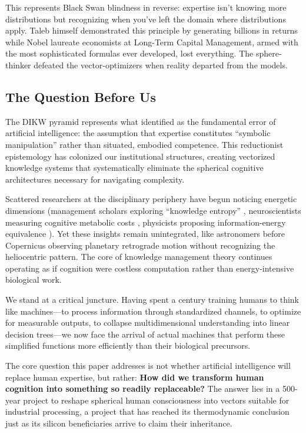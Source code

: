 This represents \citet{taleb2007} Black Swan blindness in reverse: expertise isn't knowing more distributions but recognizing when you've left the domain where distributions apply. Taleb himself demonstrated this principle by generating billions in returns while Nobel laureate economists at Long-Term Capital Management, armed with the most sophisticated formulas ever developed, lost everything. The sphere-thinker defeated the vector-optimizers when reality departed from the models.

\subsection{The Question Before Us}

The DIKW pyramid represents what \citet{dreyfus1979} identified as the fundamental error of artificial intelligence: the assumption that expertise constitutes ``symbolic manipulation'' rather than situated, embodied competence. This reductionist epistemology has colonized our institutional structures, creating vectorized knowledge systems that systematically eliminate the spherical cognitive architectures necessary for navigating complexity.

Scattered researchers at the disciplinary periphery have begun noticing energetic dimensions (management scholars exploring ``knowledge entropy'' \citep{bratianu2020}, neuroscientists measuring cognitive metabolic costs \citep{wiehler2022}, physicists proposing information-energy equivalence \citep{stonier1996}). Yet these insights remain unintegrated, like astronomers before Copernicus observing planetary retrograde motion without recognizing the heliocentric pattern. The core of knowledge management theory continues operating as if cognition were costless computation rather than energy-intensive biological work.

We stand at a critical juncture. Having spent a century training humans to think like machines---to process information through standardized channels, to optimize for measurable outputs, to collapse multidimensional understanding into linear decision trees---we now face the arrival of actual machines that perform these simplified functions more efficiently than their biological precursors.

The core question this paper addresses is not whether artificial intelligence will replace human expertise, but rather: \textbf{How did we transform human cognition into something so readily replaceable?} The answer lies in a 500-year project to reshape spherical human consciousness into vectors suitable for industrial processing, a project that has reached its thermodynamic conclusion just as its silicon beneficiaries arrive to claim their inheritance.

